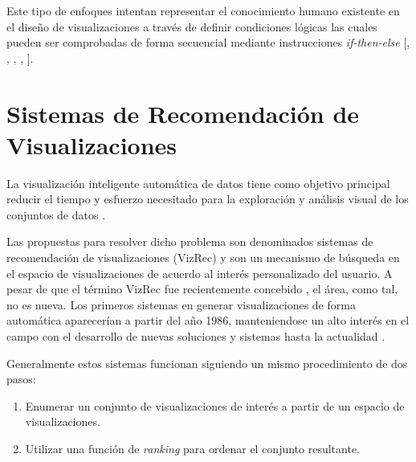 Este tipo de enfoques intentan representar el conocimiento humano existente \cite{bertin1983semiology} en el dise\~no
de visualizaciones a trav\'es de definir condiciones l\'ogicas las cuales pueden ser comprobadas de forma
secuencial mediante instrucciones \textit{if-then-else} [\cite*{mackinlay1986automating}, \cite*{mackinlay2007show}, \cite*{roth1994interactive}, \cite*{wongsuphasawat2015voyager}, \cite*{moritz2018draco}].




\section{Sistemas de Recomendaci\'on de Visualizaciones}

La visualizaci\'on inteligente autom\'atica de datos tiene como objetivo
principal reducir el tiempo y esfuerzo necesitado para la exploraci\'on y
an\'alisis visual de los conjuntos de datos \cite{zeng2021we}. 

Las propuestas para
resolver dicho problema son denominados sistemas de recomendaci\'on de
visualizaciones (VizRec) y son un mecanismo de b\'usqueda en el espacio de visualizaciones
de acuerdo al inter\'es personalizado del usuario. A pesar de que el t\'ermino
VizRec fue recientemente concebido \cite{vartak2017towards}, el \'area, como tal, no es nueva.
Los primeros sistemas en generar visualizaciones de forma autom\'atica aparecer\'ian
a partir del a\~no 1986, manteniendose un alto inter\'es en el campo con el desarrollo
de nuevas soluciones y sistemas hasta la actualidad \cite{godfrey2016interactive}. 

Generalmente estos sistemas funcionan siguiendo un mismo procedimiento de dos pasos:
\begin{enumerate}
    \item Enumerar un conjunto de visualizaciones de inter\'es a partir de un espacio de visualizaciones.
    \item Utilizar una funci\'on de \textit{ranking} para ordenar el conjunto resultante.
\end{enumerate}

